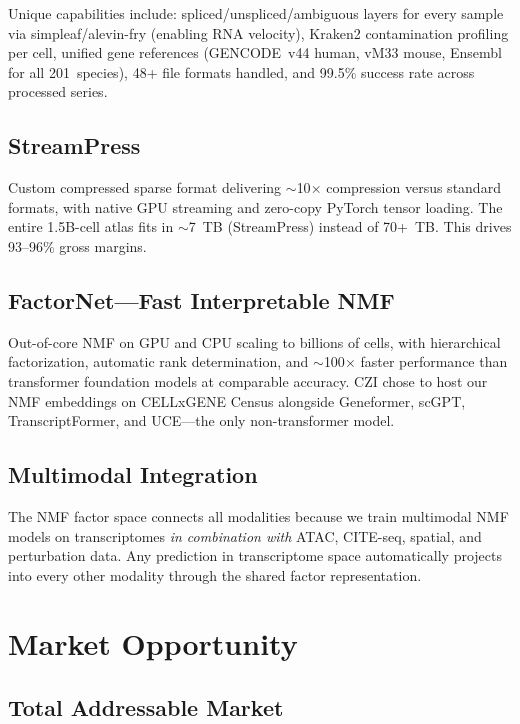 \documentclass[10pt,twocolumn,letterpaper]{article}
\begin{document}
Unique capabilities include: spliced/unspliced/ambiguous layers for every sample
via simpleaf/alevin-fry (enabling RNA velocity), Kraken2 contamination profiling
per cell, unified gene references (GENCODE~v44 human, vM33 mouse, Ensembl for
all 201~species), 48+ file formats handled, and 99.5\% success rate across
processed series.

\subsection{StreamPress}

Custom compressed sparse format delivering $\sim$10$\times$ compression versus
standard formats, with native GPU streaming and zero-copy PyTorch tensor loading.
The entire 1.5B-cell atlas fits in $\sim$7~TB (StreamPress) instead of 70+~TB.
This drives 93--96\% gross margins.

\subsection{FactorNet---Fast Interpretable NMF}

Out-of-core NMF on GPU and CPU scaling to billions of cells, with hierarchical
factorization, automatic rank determination, and $\sim$100$\times$ faster
performance than transformer foundation models at comparable accuracy. CZI chose
to host our NMF embeddings on CELLxGENE Census alongside Geneformer, scGPT,
TranscriptFormer, and UCE---the only non-transformer model.

\subsection{Multimodal Integration}

The NMF factor space connects all modalities because we train multimodal NMF
models on transcriptomes \emph{in combination with} ATAC, CITE-seq, spatial, and
perturbation data. Any prediction in transcriptome space automatically projects
into every other modality through the shared factor representation.

\section{Market Opportunity}
\label{sec:market}

\subsection{Total Addressable Market}
\end{document}
